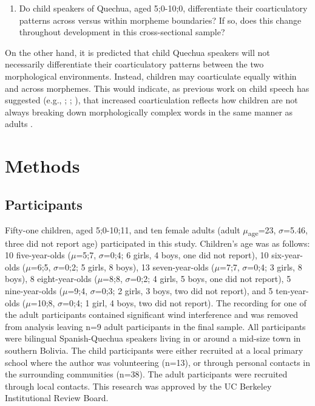 \documentclass[a4paper,man,floatsintext,natbib,donotrepeattitle, apacite]{apa6}
\begin{document}
\begin{enumerate}[resume]
    \item Do child speakers of Quechua, aged 5;0-10;0, differentiate their coarticulatory patterns across versus within morpheme boundaries? If so, does this change throughout development in this cross-sectional sample? 
\end{enumerate}

On the other hand, it is predicted that child Quechua speakers will not necessarily differentiate their coarticulatory patterns between the two morphological environments. Instead, children may coarticulate equally within and across morphemes. This would indicate, as previous work on child speech has suggested (e.g., \citealt{noiraySpokenLanguageDevelopment2019}; \citealt{redfordGrammaticalWordProduction2018}; \citealt{zharkovaCoarticulationIndicatorSpeech2011}), that increased coarticulation reflects how children are not always breaking down morphologically complex words in the same manner as adults \citep{redfordGrammaticalWordProduction2018}. 

\section{Methods}

\subsection{Participants}

Fifty-one children, aged 5;0-10;11, and ten female adults (adult $\mu$\textsubscript{age}=23, $\sigma$=5.46, three did not report age) participated in this study. Children's  age was as follows: 10 five-year-olds ($\mu$=5;7, $\sigma$=0;4; 6 girls, 4 boys, one did not report), 10 six-year-olds ($\mu$=6;5, $\sigma$=0;2; 5 girls, 8 boys), 13 seven-year-olds ($\mu$=7;7, $\sigma$=0;4; 3 girls, 8 boys), 8 eight-year-olds ($\mu$=8;8, $\sigma$=0;2; 4 girls, 5 boys, one did not report), 5 nine-year-olds ($\mu$=9;4, $\sigma$=0;3; 2 girls, 3 boys, two did not report), and 5 ten-year-olds ($\mu$=10;8, $\sigma$=0;4; 1 girl, 4 boys, two did not report). The recording for one of the adult participants contained significant wind interference and was removed from analysis leaving n=9 adult participants in the final sample. All participants were bilingual Spanish-Quechua speakers living in or around a mid-size town in southern Bolivia. The child participants were either recruited at a local primary school where the author was volunteering (n=13), or through personal contacts in the surrounding communities (n=38). The adult participants were recruited through local contacts. This research was approved by the UC Berkeley Institutional Review Board. 
\end{document}
